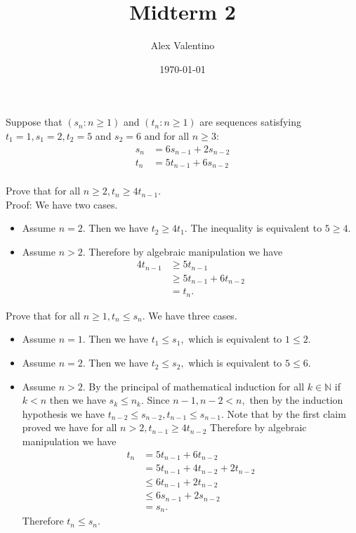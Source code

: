 \documentclass[12pt, letterpaper]{article}
\date{\today}
\author{Alex Valentino}
\title{Midterm 2}
\newcommand{\N}{\mathbb{N}}
\begin{document}
	Suppose that $(s_n : n \geq 1)$ and $(t_n : n \geq 1)$ are sequences satisfying $t_1 = 1, s_1 = 2, t_2 = 5$ and  $s_2 = 6$ and for all $n \geq 3$:
	\begin{align*}
	s_n &= 6s_{n-1} + 2s_{n-2}\\
	t_n &= 5t_{n-1} + 6s_{n-2}
	\end{align*}\\
	Prove that for all $n\geq 2, t_n \geq 4t_{n-1}$.\\
	Proof: We have two cases.
	\begin{itemize}
		\item Assume $n=2$.  Then we have $t_2 \geq 4t_1.$  The inequality is equivalent to $5 \geq 4.$
		\item Assume $n>2$.  Therefore by algebraic manipulation we have 
		\begin{align*}
			4t_{n-1} &\geq 5t_{n-1}\\
			&\geq  5t_{n-1} + 6t_{n-2}\\
			&= t_n.
		\end{align*}
	\end{itemize}
	
	
	Prove that for all $n \geq 1, t_n \leq s_n$.  We have three cases.
	\begin{itemize}
		\item Assume $n=1$.  Then we have $t_1 \leq s_1,$ which is equivalent to $1 \leq 2.$
		\item Assume $n=2$.  Then we have $t_2 \leq s_2,$ which is equivalent to $5 \leq 6.$
		\item Assume $n > 2.$  By the principal of mathematical induction for all $k \in \N$ if $k < n$ then we have $s_k \leq n_k.$  Since $n-1, n-2 < n,$ then by the induction hypothesis we have $t_{n-2} \leq s_{n-2}, t_{n-1} \leq s_{n-1}.$  Note that by the first claim proved we have for all $ n > 2, t_{n-1} \geq 4t_{n-2}$  Therefore by algebraic manipulation we have \begin{align*}
			t_n &= 5t_{n-1} + 6t_{n-2}\\
			&= 5t_{n-1} + 4t_{n-2} + 2t_{n-2}\\
			&\leq 6t_{n-1} + 2t_{n-2}\\
			&\leq 6s_{n-1} + 2s_{n-2}\\
			&= s_n.
		\end{align*}
		Therefore $t_n \leq s_n.$
	\end{itemize}
\end{document}

